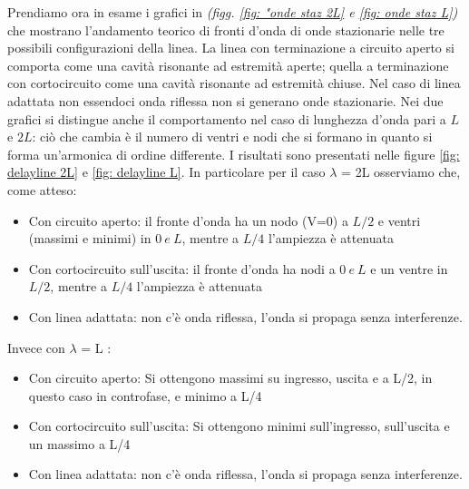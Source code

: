 \documentclass[journal]{IEEEtran}
\begin{document}
Prendiamo ora in esame i grafici in \textit{(figg. \ref{fig: "onde staz 2L} e \ref{fig: onde staz L})} che mostrano l'andamento teorico di fronti d'onda di onde stazionarie nelle tre possibili configurazioni della linea.
La linea con terminazione a circuito aperto si comporta come una cavità risonante ad estremità aperte; quella a terminazione con cortocircuito come una cavità risonante ad estremità chiuse. Nel caso di linea adattata non essendoci onda riflessa non si generano onde stazionarie. Nei due grafici si distingue anche il comportamento nel caso di lunghezza d'onda pari a $L$ e $2L$: ciò che cambia è il numero di ventri e nodi che si formano in quanto si forma un'armonica di ordine differente. I risultati sono presentati nelle figure \ref{fig: delayline 2L} e \ref{fig: delayline L}. In particolare per il caso $\lambda$ = 2L osserviamo che, come atteso:
\begin{itemize}
    \item Con circuito aperto: il fronte d'onda ha un nodo (V=0) a $L/2$ e ventri (massimi e minimi) in $0 \ e\ L$, mentre a $L/4$ l'ampiezza è attenuata 
    \item Con cortocircuito sull'uscita: il fronte d'onda ha nodi a $0\ e\ L$ e un ventre in $L/2$, mentre a $L/4$ l'ampiezza è attenuata
    \item Con linea adattata: non c'è onda riflessa, l'onda si propaga senza interferenze.
\end{itemize}
Invece con $\lambda$ = L :
\begin{itemize}
    \item Con circuito aperto: Si ottengono massimi su ingresso, uscita e a L/2, in questo caso in controfase, e minimo a L/4
    \item Con cortocircuito sull'uscita: Si ottengono minimi sull'ingresso, sull'uscita e un massimo a L/4
    \item Con linea adattata: non c'è onda riflessa, l'onda si propaga senza interferenze.
\end{itemize}


\clearpage
\end{document}

